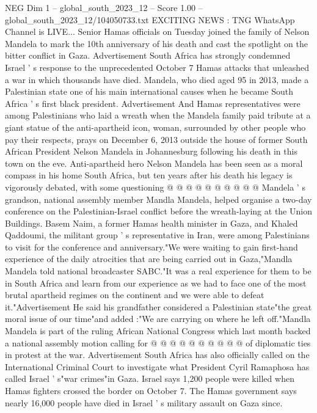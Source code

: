 \begin{textsample}{NEG Dim 1 – global\_south\_2023\_12 – Score 1.00 – global\_south\_2023\_12/104050733.txt}  \label{ex:f1_neg_412}
EXCITING NEWS : TNG WhatsApp Channel is LIVE...
Senior Hamas officials on Tuesday joined the family of Nelson Mandela to mark the 10th anniversary of his death and cast the spotlight on the bitter conflict in Gaza.
Advertisement South Africa has strongly condemned Israel ' s response to the unprecedented October 7 Hamas attacks that unleashed a war in which thousands have died.
Mandela, who died aged 95 in 2013, made a Palestinian state one of his main international causes when he became South Africa ' s first black president.
Advertisement And Hamas representatives were among Palestinians who laid a wreath when the Mandela family paid tribute at a giant statue of the anti-apartheid icon, woman, surrounded by other people who pay their respects, prays on December 6, 2013 outside the house of former South African President Nelson Mandela in Johannesburg following his death in this town on the eve.
Anti-apartheid hero Nelson Mandela has been seen as a moral compass in his home South Africa, but ten years after his death his legacy is vigorously debated, with some questioning @ @ @ @ @ @ @ @ @ @ Mandela ' s grandson, national assembly member Mandla Mandela, helped organise a two-day conference on the Palestinian-Israel conflict before the wreath-laying at the Union Buildings.
Basem Naim, a former Hamas health minister in Gaza, and Khaled Qaddoumi, the militant group ' s representative in Iran, were among Palestinians to visit for the conference and anniversary."We were waiting to gain first-hand experience of the daily atrocities that are being carried out in Gaza,"Mandla Mandela told national broadcaster SABC."It was a real experience for them to be in South Africa and learn from our experience as we had to face one of the most brutal apartheid regimes on the continent and we were able to defeat it."Advertisement He said his grandfather considered a Palestinian state"the great moral issue of our time"and added :"We are carrying on where he left off."Mandla Mandela is part of the ruling African National Congress which last month backed a national assembly motion calling for @ @ @ @ @ @ @ @ @ @ of diplomatic ties in protest at the war.
Advertisement South Africa has also officially called on the International Criminal Court to investigate what President Cyril Ramaphosa has called Israel ' s"war crimes"in Gaza.
Israel says 1,200 people were killed when Hamas fighters crossed the border on October 7.
The Hamas government says nearly 16,000 people have died in Israel ' s military assault on Gaza since.

\end{textsample}

